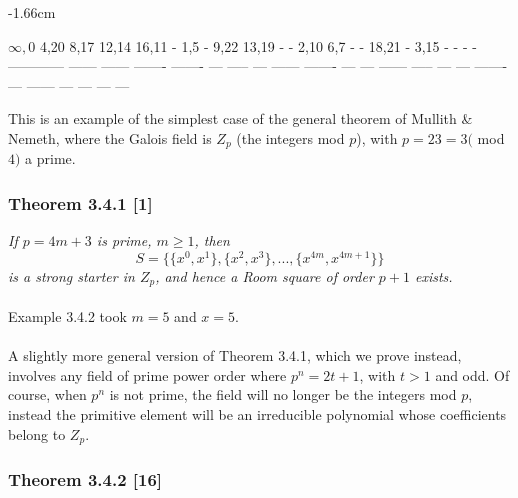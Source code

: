 \documentclass[
  12pt,
  a4paper]{book}
\begin{document}
{-1.66cm}

\(\infty,0\) 4,20 8,17 12,14 16,11 - 1,5 - 9,22 13,19 - - 2,10 6,7 - -
18,21 - 3,15 - - - - ------------ ------ ------ ------- ------- ---
----- --- ------ ------- --- --- ------ ----- --- --- ------- --- ------
--- --- --- ---

This is an example of the simplest case of the general theorem of
Mullith \& Nemeth, where the Galois field is \(Z_p\) (the integers mod
\(p\)), with \(p=23=3(\) mod \(4)\) a prime.\\

\hypertarget{theorem-3.4.1-1}{%
\subsubsection{Theorem 3.4.1 {[}1{]}}\label{theorem-3.4.1-1}}

\emph{If \(p=4m+3\) is prime, \(m \geq 1\), then}
\[S=\{\{x^0,x^1\},\{x^2,x^3\},...,\{x^{4m},x^{4m+1}\}\}\] \emph{is a
strong starter in \(Z_p\), and hence a Room square of order \(p+1\)
exists.}\\
~\\
Example 3.4.2 took \(m=5\) and \(x=5\).\\
~\\
A slightly more general version of Theorem 3.4.1, which we prove
instead, involves any field of prime power order where \(p^n=2t+1\),
with \(t>1\) and odd. Of course, when \(p^n\) is not prime, the field
will no longer be the integers mod \(p\), instead the primitive element
will be an irreducible polynomial whose coefficients belong to \(Z_p\).

\hypertarget{theorem-3.4.2-16}{%
\subsubsection{Theorem 3.4.2 {[}16{]}}\label{theorem-3.4.2-16}}
\end{document}

